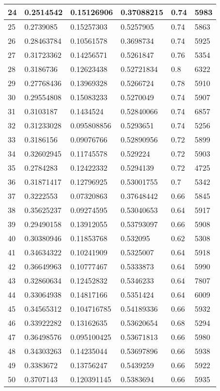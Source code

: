 \begin{longtable}{|l|l|l|l|l|l|}
24 & 0.2514542 & 0.15126906 & 0.37088215 & 0.74 & 5983 \\ \hline 
25 & 0.2739085 & 0.15257303 & 0.5257905 & 0.74 & 5863 \\ \hline 
26 & 0.28463784 & 0.10561578 & 0.3698734 & 0.74 & 5925 \\ \hline 
27 & 0.31723362 & 0.14256571 & 0.5261847 & 0.76 & 5354 \\ \hline 
28 & 0.3186736 & 0.12623438 & 0.52721834 & 0.8 & 6322 \\ \hline 
29 & 0.27768436 & 0.13969328 & 0.5266724 & 0.78 & 5910 \\ \hline 
30 & 0.29554808 & 0.15083233 & 0.5270049 & 0.74 & 5907 \\ \hline 
31 & 0.3103187 & 0.1434524 & 0.52840066 & 0.74 & 6857 \\ \hline 
32 & 0.31233028 & 0.095808856 & 0.5293651 & 0.74 & 5256 \\ \hline 
33 & 0.3186156 & 0.09076766 & 0.52890956 & 0.72 & 5899 \\ \hline 
34 & 0.32602945 & 0.11745578 & 0.529224 & 0.72 & 5903 \\ \hline 
35 & 0.2784283 & 0.12422332 & 0.5294139 & 0.72 & 4725 \\ \hline 
36 & 0.31871417 & 0.12796925 & 0.53001755 & 0.7 & 5342 \\ \hline 
37 & 0.3222553 & 0.07320863 & 0.37648442 & 0.66 & 5845 \\ \hline 
38 & 0.35625237 & 0.09274595 & 0.53040653 & 0.64 & 5917 \\ \hline 
39 & 0.29490158 & 0.13912055 & 0.53793097 & 0.66 & 5908 \\ \hline 
40 & 0.30380946 & 0.11853768 & 0.532095 & 0.62 & 5308 \\ \hline 
41 & 0.34634322 & 0.10241909 & 0.5325007 & 0.64 & 5918 \\ \hline 
42 & 0.36649963 & 0.10777467 & 0.5333873 & 0.64 & 5990 \\ \hline 
43 & 0.32860634 & 0.12452832 & 0.5346233 & 0.64 & 7807 \\ \hline 
44 & 0.33064938 & 0.14817166 & 0.5351424 & 0.64 & 6009 \\ \hline 
45 & 0.34565312 & 0.104716785 & 0.54189336 & 0.66 & 5932 \\ \hline 
46 & 0.33922282 & 0.13162635 & 0.53620654 & 0.68 & 5294 \\ \hline 
47 & 0.36498576 & 0.095100425 & 0.53671813 & 0.66 & 5980 \\ \hline 
48 & 0.34303263 & 0.14235044 & 0.53697896 & 0.66 & 5938 \\ \hline 
49 & 0.3383672 & 0.13756247 & 0.5439259 & 0.66 & 5922 \\ \hline 
50 & 0.3707143 & 0.120391145 & 0.5383694 & 0.66 & 5935 \\ \hline 
\end{longtable}